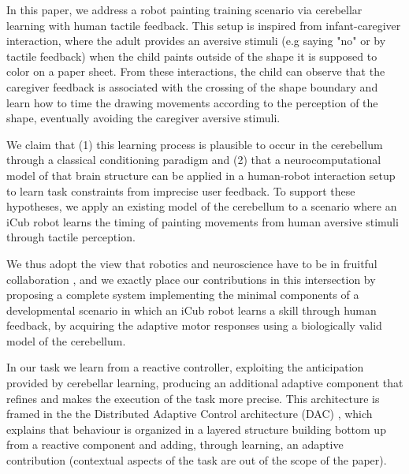 \documentclass[letterpaper, 10 pt, conference]{ieeeconf}  %
\newcommand\jp[1]{{\color{red}}{\color{red}}{\footnotesize \color{red}[#1 - \textbf{Jordi}]}} %
\begin{document}
In this paper, we address a robot painting training scenario via cerebellar learning with human tactile feedback. This setup is inspired from infant-caregiver interaction, where the adult provides an aversive stimuli (e.g saying "no" or by tactile feedback) when the child paints outside of the shape it is supposed to color on a paper sheet. From these interactions, the child can observe that the caregiver feedback is associated with the crossing of the shape boundary and learn how to time the drawing movements according to the perception of the shape, eventually avoiding the caregiver aversive stimuli. 

We claim that (1) this learning process is plausible to occur in the cerebellum through a classical conditioning paradigm and (2) that a neurocomputational model of that brain structure can be applied in a human-robot interaction setup to learn task constraints from imprecise user feedback. To support these hypotheses, we apply an existing model of the  cerebellum  \cite{herreros2013nucleo} to a scenario where an iCub robot \cite{metta2008icub} learns the timing of painting movements from human aversive stimuli through tactile perception. %

We thus adopt the view that robotics and neuroscience have to be in fruitful collaboration \cite{floreano2014robotics}, and we exactly place our contributions in this intersection by proposing a complete system implementing the minimal components of a developmental scenario in which an iCub robot learns a skill through human feedback, by acquiring the adaptive motor responses using a biologically valid model of the cerebellum.

In our task we learn from a reactive controller, exploiting the anticipation provided by cerebellar learning, producing an additional adaptive component that refines and makes the execution of the task more precise. This architecture is framed in the the Distributed Adaptive Control architecture (DAC) \cite{verschure2003environmentally} , which explains that behaviour is organized in a layered structure building bottom up from a reactive component and adding, through learning, an adaptive contribution (contextual aspects of the task are out of the scope of the paper). 
\end{document}
